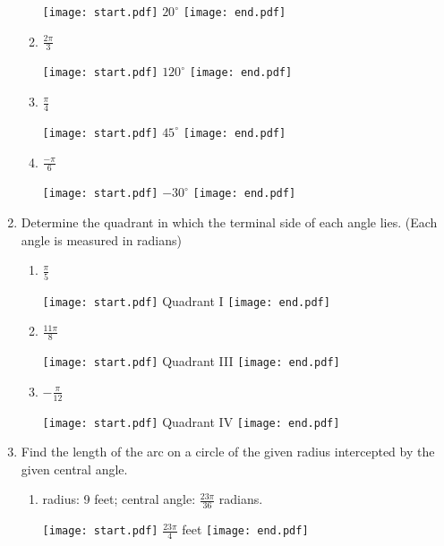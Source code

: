 \documentclass[12pt]{article}
\begin{document}
\begin{enumerate}
\begin{enumerate}
\texttt{[image: start.pdf]}
{$\displaystyle 20^{\circ}$}
\texttt{[image: end.pdf]}


\item $\displaystyle \frac{2\pi}{3}$

\texttt{[image: start.pdf]}
{$\displaystyle 120^{\circ}$}
\texttt{[image: end.pdf]}


\item $\displaystyle \frac{\pi}{4}$

\texttt{[image: start.pdf]}
{$\displaystyle 45^{\circ}$}
\texttt{[image: end.pdf]}


\item $\displaystyle \frac{-\pi}{6}$

\texttt{[image: start.pdf]}
{$\displaystyle -30^{\circ}$}
\texttt{[image: end.pdf]}


\end{enumerate}

\item Determine the quadrant in which the terminal side of each angle lies. \newline (Each angle is measured in radians)

\begin{enumerate}

\item $\displaystyle \frac{\pi}{5}$

\texttt{[image: start.pdf]}
{Quadrant I}
\texttt{[image: end.pdf]}


\item $\displaystyle \frac{11\pi}{8}$

\texttt{[image: start.pdf]}
{Quadrant III}
\texttt{[image: end.pdf]}


\item $\displaystyle -\frac{\pi}{12}$

\texttt{[image: start.pdf]}
{Quadrant IV}
\texttt{[image: end.pdf]}


\end{enumerate}

\item Find the length of the arc on a circle of the given radius intercepted by the given central angle.  

\begin{enumerate}

\item radius: 9 feet; central angle: $\frac{23\pi}{36}$ radians.

\texttt{[image: start.pdf]}
{$\displaystyle \frac{23\pi}{4}$ feet}
\texttt{[image: end.pdf]}



\end{enumerate}
\end{enumerate}
\end{document}
